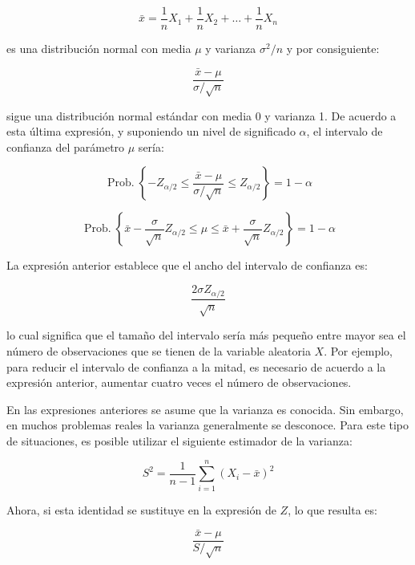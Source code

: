 \documentclass[11pt,letterpaper]{report}
\newcommand{\Prob}{\operatorname{Prob.}}
\begin{document}
\begin{equation}
\bar{x} = \frac{1}{n}X_1 + \frac{1}{n}X_2 + \ldots + \frac{1}{n}X_n
\end{equation}

es una distribución normal con media $\mu$ y varianza $\sigma^2/n$ y
por consiguiente:

\begin{equation}
\frac{\bar{x} - \mu}{\sigma/\sqrt{n}}
\end{equation}

sigue una distribución normal estándar con media 0 y varianza 1. De
acuerdo a esta última expresión, y suponiendo un nivel de significado
$\alpha$, el intervalo de confianza del parámetro $\mu$ sería:

\[
\Prob\left\{ -Z_{\alpha/2} \le \frac{\bar{x}-\mu}{\sigma/\sqrt{n}} \le Z_{\alpha/2} \right\} = 1-\alpha
\]

\begin{equation}
\Prob\left\{ \bar{x} - \frac{\sigma}{\sqrt{n}}Z_{\alpha/2} \le \mu \le \bar{x} + \frac{\sigma}{\sqrt{n}}Z_{\alpha/2} \right\} = 1-\alpha
\end{equation}

La expresión anterior establece que el ancho del intervalo de confianza
es:

\begin{equation}
\frac{2\sigma Z_{\alpha/2}}{\sqrt{n}}
\end{equation}

lo cual significa que el tamaño del intervalo sería más pequeño entre
mayor sea el número de observaciones que se tienen de la variable
aleatoria $X$. Por ejemplo, para reducir el intervalo de confianza a la
mitad, es necesario de acuerdo a la expresión anterior, aumentar cuatro
veces el número de observaciones.

En las expresiones anteriores se asume que la varianza es conocida. Sin
embargo, en muchos problemas reales la varianza generalmente se
desconoce. Para este tipo de situaciones, es posible utilizar el
siguiente estimador de la varianza:

\begin{equation}
S^2 = \frac{1}{n-1} \sum_{i=1}^{n} (X_i - \bar{x})^2
\end{equation}

Ahora, si esta identidad se sustituye en la expresión de $Z$, lo que
resulta es:

\begin{equation}
\frac{\bar{x} - \mu}{S/\sqrt{n}}
\end{equation}
\end{document}
